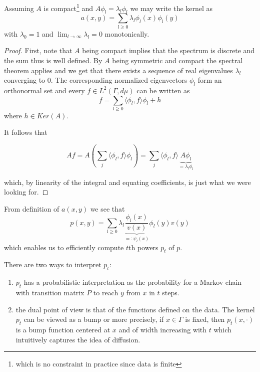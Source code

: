 \begin{theorem}
Assuming $A$ is compact\footnote{which is no constraint in practice since data is finite} and $A\phi_l=\lambda_l\phi_l$ we may write the kernel as
\begin{equation*}
a(x,y)=\sum_{l\geq 0}\lambda_l\phi_l(x)\phi_l(y)
\end{equation*}
with $\lambda_0 = 1$ and $\lim_{l\rightarrow\infty}\lambda_l = 0$ monotonically.
\end{theorem}
\begin{proof}
First, note that $A$ being compact implies that the spectrum is discrete and the sum thus is well defined. By $A$ being symmetric and compact the spectral theorem applies and we get that there exists a sequence of real eigenvalues $\lambda_l$ converging to $0$. The corresponding normalized eigenvectors $\phi_l$ form an orthonormal set and every $f\in L^2(\Gamma,d\mu)$ can be written as
$$f=\sum_{l\geq 0}\langle \phi_l,f\rangle \phi_l + h$$
where $h\in Ker(A)$.

It follows that

$$Af = A\left(\sum_j \langle \phi_l, f \rangle \phi_l\right) = \sum_j \langle\phi_l, f \rangle \underbrace{A\phi_l}_{=\lambda_l \phi_l}$$


which, by linearity of the integral and equating coefficients, is just what we were looking for.
\end{proof}
From definition of $a(x,y)$ we see that 
\begin{equation}\label{eq:spectralDecompositionOfP}
p(x,y)=\sum_{l\geq 0}\lambda_l\underbrace{\frac{\phi_l(x)}{v(x)}}_{=:\psi_l(x)}\phi_l(y)v(y)
\end{equation}
 which enables us to efficiently compute $t$th powers $p_t$ of $p$.

There are two ways to interpret $p_t$:
\begin{enumerate}
\item $p_t$ has a probabilistic interpretation as the probability for a Markov chain with transition matrix $P$ to reach $y$ from $x$ in $t$ steps.
\item the dual point of view is that of the functions defined on the data. The kernel $p_t$ can be viewed as a bump or more precisely, if $x\in\Gamma$ is fixed, then $p_t(x, \cdotp)$ is a bump function centered at $x$ and of width increasing with $t$ which intuitively captures the idea of diffusion.
\end{enumerate}

